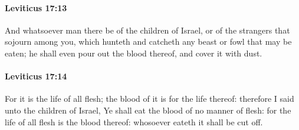 		\paragraph{Leviticus 17:13} %
			\label{LEVITICUS-17-13}

			And whatsoever man there be of the children of Israel, or of the strangers that sojourn among you, which hunteth and catcheth any beast or fowl that may be eaten; he shall even pour out the blood thereof, and cover it with dust.


		\paragraph{Leviticus 17:14} %
			\label{LEVITICUS-17-14}

			For it is the life of all flesh; the blood of it is for the life thereof: therefore I said unto the children of Israel, Ye shall eat the blood of no manner of flesh: for the life of all flesh is the blood thereof: whosoever eateth it shall be cut off.

